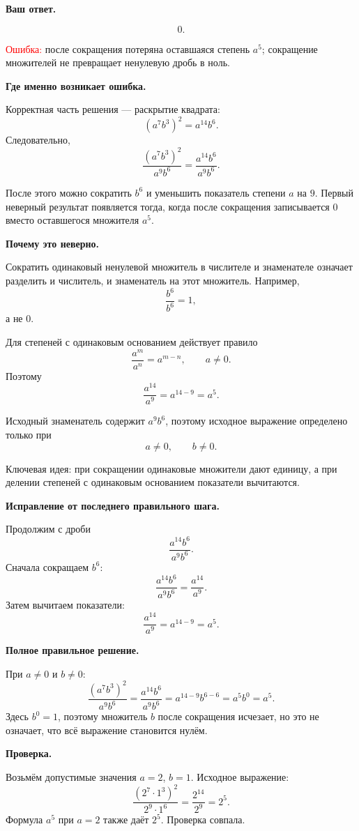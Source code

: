 \documentclass[12pt,a4paper]{article}
\begin{document}
\textbf{Ваш ответ.}

\[
0.
\]

\textcolor{red}{Ошибка:} после сокращения потеряна оставшаяся степень $a^5$; сокращение множителей не превращает ненулевую дробь в ноль.

\textbf{Где именно возникает ошибка.}

Корректная часть решения --- раскрытие квадрата:
\[
(a^7b^3)^2=a^{14}b^6.
\]
Следовательно,
\[
\frac{(a^7b^3)^2}{a^9b^6}
=
\frac{a^{14}b^6}{a^9b^6}.
\]

После этого можно сократить $b^6$ и уменьшить показатель степени $a$ на $9$. Первый неверный результат появляется тогда, когда после сокращения записывается $0$ вместо оставшегося множителя $a^5$.

\textbf{Почему это неверно.}

Сократить одинаковый ненулевой множитель в числителе и знаменателе означает разделить и числитель, и знаменатель на этот множитель. Например,
\[
\frac{b^6}{b^6}=1,
\]
а не $0$.

Для степеней с одинаковым основанием действует правило
\[
\frac{a^m}{a^n}=a^{m-n},\qquad a\ne0.
\]
Поэтому
\[
\frac{a^{14}}{a^9}=a^{14-9}=a^5.
\]

Исходный знаменатель содержит $a^9b^6$, поэтому исходное выражение определено только при
\[
a\ne0,\qquad b\ne0.
\]

\textcolor{blue!60!black}{Ключевая идея:} при сокращении одинаковые множители дают единицу, а при делении степеней с одинаковым основанием показатели вычитаются.

\textbf{Исправление от последнего правильного шага.}

Продолжим с дроби
\[
\frac{a^{14}b^6}{a^9b^6}.
\]
Сначала сокращаем $b^6$:
\[
\frac{a^{14}b^6}{a^9b^6}
=
\frac{a^{14}}{a^9}.
\]
Затем вычитаем показатели:
\[
\frac{a^{14}}{a^9}=a^{14-9}=a^5.
\]

\textbf{Полное правильное решение.}

При $a\ne0$ и $b\ne0$:
\[
\frac{(a^7b^3)^2}{a^9b^6}
=
\frac{a^{14}b^6}{a^9b^6}
=
a^{14-9}b^{6-6}
=
a^5b^0
=
a^5.
\]
Здесь $b^0=1$, поэтому множитель $b$ после сокращения исчезает, но это не означает, что всё выражение становится нулём.

\textbf{Проверка.}

Возьмём допустимые значения $a=2$, $b=1$. Исходное выражение:
\[
\frac{(2^7\cdot1^3)^2}{2^9\cdot1^6}
=
\frac{2^{14}}{2^9}
=
2^5.
\]
Формула $a^5$ при $a=2$ также даёт $2^5$. Проверка совпала.
\end{document}
